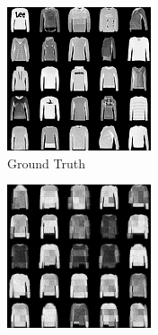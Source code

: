 \begin{figure}[H]
    \centering
    \begin{subfigure}[b]{0.24\textwidth}
        \centering
        \includegraphics[width=\textwidth]{figures/einsum/fashion-mnist/2fashion-mnist_ground_truth.png}
        \caption{Ground Truth}
    \end{subfigure}
    \begin{subfigure}[b]{0.24\textwidth}
        \centering
        \includegraphics[width=\textwidth]{figures/einsum/fashion-mnist/2fashion-mnist_EM.png}

\end{subfigure}
\end{figure}
